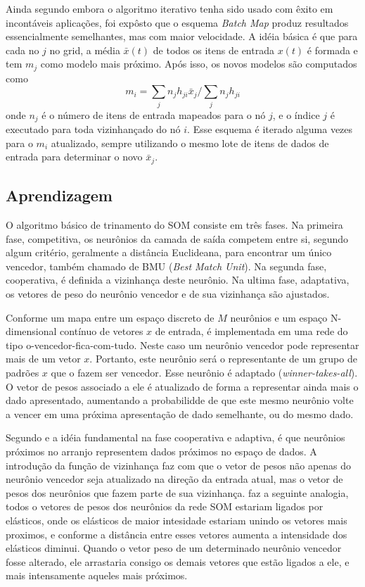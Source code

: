 \documentclass[
	12pt,				%
	openright,			%
	twoside,			%
	a4paper,			%
	english,			%
	french,				%
	spanish,			%
	brazil				%
	]{abntex2}
\begin{document}
Ainda segundo  embora o algoritmo iterativo tenha sido usado com êxito em  incontáveis aplicações, foi expôsto que o esquema \emph{Batch Map} produz resultados essencialmente semelhantes, mas com maior velocidade. A idéia básica é que para cada no $j$ no grid, a média $\bar{x}(t)$ de todos os itens de entrada $x(t)$ é formada e tem $m_j$ como modelo mais próximo. Após isso, os novos modelos são computados como $$m_i = \sum_jn_jh_{ji}\bar{x}_j/\sum_j n_j h_{ji}$$ onde $n_j$ é o número de itens de entrada mapeados para o nó $j$, e o índice $j$ é executado  para toda vizinhançado do nó $i$. Esse esquema é iterado alguma vezes para o $m_i$ atualizado, sempre utilizando o mesmo lote de itens de dados de entrada para determinar o novo $\bar{x}_j$.
\subsection{Aprendizagem}

O algoritmo básico de trinamento do SOM consiste em três fases. Na primeira fase, competitiva, os neurônios da camada de saída competem entre si, segundo algum critério, geralmente a distância Euclideana, para encontrar um único vencedor, também chamado de BMU (\emph{Best Match Unit}). Na segunda fase, cooperativa, é definida a vizinhança deste neurônio. Na ultima fase, adaptativa, os vetores de peso do neurônio vencedor e de sua vizinhança são ajustados.\cite[p.34]{da2004mapas}

Conforme  um mapa entre um espaço discreto de $M$ neurônios e um espaço N-dimensional contínuo de vetores $x$ de entrada, é implementada em uma rede do tipo o-vencedor-fica-com-tudo. Neste caso um neurônio vencedor pode representar mais de um vetor $x$. Portanto, este neurônio será o representante de um grupo de padrões $x$ que o fazem ser vencedor. Esse neurônio é adaptado (\emph{winner-takes-all}). O vetor de pesos associado a ele é atualizado de forma a representar ainda mais o dado apresentado, aumentando a probabilidde de que este mesmo neurônio volte a vencer em uma próxima apresentação de dado semelhante, ou do mesmo dado.

Segundo  e  a idéia fundamental na fase cooperativa e adaptiva, é que neurônios próximos no arranjo representem dados próximos no espaço de dados. A introdução da função de vizinhança faz com que o vetor de pesos não apenas do neurônio vencedor seja atualizado na direção da entrada atual, mas o vetor de pesos dos neurônios que fazem parte de sua vizinhança.  faz a seguinte analogia, todos o vetores de pesos dos neurônios da rede SOM estariam ligados por elásticos, onde os elásticos de maior intesidade estariam unindo os vetores mais proximos, e conforme a distância entre esses vetores aumenta a intensidade dos elásticos diminui. Quando o vetor peso de um determinado neurônio vencedor fosse alterado, ele arrastaria consigo os demais vetores que estão ligados a ele, e mais intensamente aqueles mais próximos.
\end{document}
